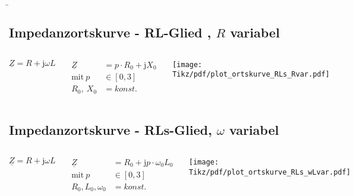 \b{
\subsection{Impedanzortskurve - RL-Glied , $R$ variabel}
\begin{frame}\ftx{\subsecname}
\begin{columns}
    \centering
    \hfill%
    \begin{equation*}
        \underline{Z}=R+\mathrm{j}\omega L
    \end{equation*}

    \begin{align*}
        \underline{Z} &= p \cdot R_0 + \mathrm{j}X_0\\
        \text{mit}\ p &\in [0,3]\\
        R_0,\ X_0 &= konst.
    \end{align*}

    \texttt{[image: Tikz/pdf/plot\_ortskurve\_RLs\_Rvar.pdf]}
\end{columns}
\end{frame}

\subsection{Impedanzortskurve - RLs-Glied, $\omega$ variabel}
\begin{frame}\ftx{\subsecname}
\begin{columns}
    \centering
    \hfill%
    \begin{equation*}
        \underline{Z}=R+\mathrm{j}\omega L
    \end{equation*}

    \begin{align*}
        \underline{Z} &= R_0 + \mathrm{j}p \cdot \omega_0L_0\\ 
        \text{mit}\ p &\in [0,3]\\
        R_0, L_0, \omega_0 &= konst.
    \end{align*}

    \texttt{[image: Tikz/pdf/plot\_ortskurve\_RLs\_wLvar.pdf]}
\end{columns}
\end{frame}
}%

